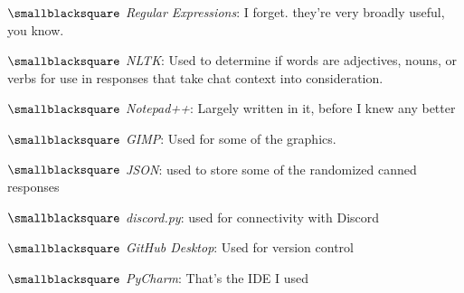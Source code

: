 \documentclass[10mm,letterpaper,notitlepage]{article}
\begin{document}
{{								$\smallblacksquare$ \textit{Regular Expressions}: I forget. they're very broadly useful, you know.
								
								$\smallblacksquare$ \textit{NLTK}: Used to determine if words are adjectives, nouns, or verbs for use in responses that take chat context into consideration.
								
								$\smallblacksquare$ \textit{Notepad++}: Largely written in it, before I knew any better
								
								$\smallblacksquare$ \textit{GIMP}: Used for some of the graphics.
								
								$\smallblacksquare$ \textit{JSON}: used to store some of the randomized canned responses
								
								$\smallblacksquare$ \textit{discord.py}: used for connectivity with Discord
								
								$\smallblacksquare$ \textit{GitHub Desktop}: Used for version control
								
								$\smallblacksquare$ \textit{PyCharm}: That's the IDE I used
								
								\setlength{\parindent}{\parindent-4mm}
							\par}
							{\color[RGB]{0, 0, 0}
							\fontsize{2.25mm}{3.0mm}\selectfont
									{\color[RGB]{108, 29, 169}
									\fontsize{4.5mm}{6.0mm}\selectfont
									\color[RGB]{98, 99, 185}{{ }}\color[RGB]{103, 75, 178}{{ }}
									\par}
							
}}
\end{document}
